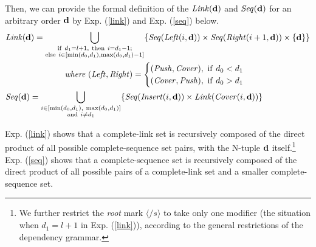 \documentclass[english]{jnlp_1.4}
\begin{document}
Then, we can provide the formal definition of the $\mathit{Link} ({\bf{d}})$ and $\mathit{Seq} ({\bf{d}})$ for an arbitrary order ${\bf d}$
by Exp. (\ref{link}) and Exp. (\ref{seq}) below.
\pagebreak
\begin{align}
 & \mathit{Link} ({\bf{d}}) = \bigcup_{\substack{\mathrm{if}\ d_1=l+1,\ \mathrm{then}\ i=d_1-1; \\ \mathrm{else}\ i \in [\min (d_0, d_1), \max (d_0,d_1)-1]}} 
	\{\mathit{Seq} (\mathit{Left} (i, {\bf{d}})) \times \mathit{Seq} (\mathit{Right} (i+1, {\bf{d}})) \times \{ {\bf{d}\} } \}
	\label{link} \\ 
&\hspace{25mm}\text{\it where}\ 
	(\mathit{Left},\mathit{Right}) = 
	\begin{cases}
	(\mathit{Push},\mathit{Cover}),\ \mathrm{if}\ d_0 < d_1 \\
	(\mathit{Cover},\mathit{Push}),\ \mathrm{if}\ d_0 > d_1
	\end{cases}
	\label{leftright} \\
 & \mathit{Seq} ({\bf{d}}) = \bigcup_{\substack{i \in [\min (d_0, d_1),\ \max (d_0, d_1)]\\ \mathrm{and}\ i \neq d_1}} 
	\{\mathit{Seq} (\mathit{Insert} (i, {\bf{d}})) \times \mathit{Link} (\mathit{Cover} (i, {\bf{d}})) \}
	\label{seq}
\end{align}

Exp. (\ref{link}) shows that a complete-link set is recursively composed of the direct product of all possible complete-sequence set pairs, with the N-tuple ${\bf {d}}$ itself.\footnote{We further restrict the {\em root} mark  $\langle \slash s \rangle$ to take only one modifier (the situation when $d_1 = l+1$ in Exp. (\ref{link})), according to the general restrictions of the dependency grammar.} Exp. (\ref{seq}) shows that a complete-sequence set is recursively composed of the direct product of all possible pairs of a complete-link set and a smaller complete-sequence set.  
\end{document}
